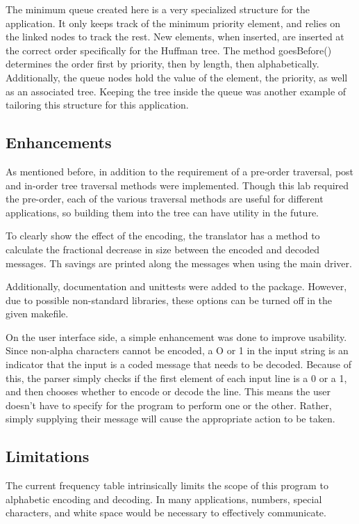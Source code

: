 \documentclass[a4paper,12pt]{article}
\begin{document}
The minimum queue created here is a very specialized structure for the application.  It only keeps track of the minimum priority element, and relies on the linked nodes to track the rest.  New elements, when inserted, are inserted at the correct order specifically for the Huffman tree.  The method goesBefore() determines the order first by priority, then by length, then alphabetically.  Additionally, the queue nodes hold the value of the element, the priority, as well as an associated tree.  Keeping the tree inside the queue was another example of tailoring this structure for this application.

\subsection{Enhancements}
As mentioned before, in addition to the requirement of a pre-order traversal, post and in-order tree traversal methods were implemented.  Though this lab required the pre-order, each of the various traversal methods are useful for different applications, so building them into the tree can have utility in the future.

To clearly show the effect of the encoding, the translator has a method to calculate the fractional decrease in size between the encoded and decoded messages.  Th savings are printed along the messages when using the main driver. 

Additionally, documentation and unittests were added to the package.  However, due to possible non-standard libraries, these options can be turned off in the given makefile.

On the user interface side, a simple enhancement was done to improve usability.  Since non-alpha characters cannot be encoded, a O or 1 in the input string is an indicator that the input is a coded message that needs to be decoded.  Because of this, the parser simply checks if the first element of each input line is a 0 or a 1, and then chooses whether to encode or decode the line.  This means the user doesn't have to specify for the program to perform one or the other.  Rather, simply supplying their message will cause the appropriate action to be taken.


\subsection{Limitations}
The current frequency table intrinsically limits the scope of this program to alphabetic encoding and decoding.  In many applications, numbers, special characters, and white space would be necessary to effectively communicate. 
\end{document}
